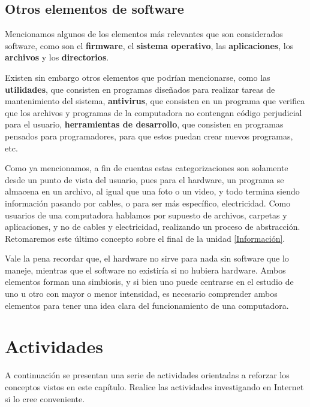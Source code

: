 \subsection{Otros elementos de software}

Mencionamos algunos de los elementos más relevantes que son considerados
software, como son el \textbf{firmware}, el \textbf{sistema operativo},
las \textbf{aplicaciones}, los \textbf{archivos} y los \textbf{directorios}.

Existen sin embargo otros elementos que podrían mencionarse, como las
\textbf{utilidades}, que consisten en programas diseñados para realizar tareas
de mantenimiento del sistema, \textbf{antivirus}, que consisten en un programa
que verifica que los archivos y programas de la computadora no contengan
código perjudicial para el usuario, \textbf{herramientas de desarrollo}, que
consisten en programas pensados para programadores, para que estos puedan
crear nuevos programas, etc.

Como ya mencionamos, a fin de cuentas estas categorizaciones son solamente
desde un punto de vista del usuario, pues para el hardware, un programa se
almacena en un archivo, al igual que una foto o un video, y todo termina
siendo información pasando por cables, o para ser más específico, electricidad.
Como usuarios de una computadora hablamos por supuesto de archivos, carpetas y
aplicaciones, y no de cables y electricidad, realizando un proceso de abstracción.
Retomaremos este último concepto sobre el final de la unidad \ref{Información}.

Vale la pena recordar que, el hardware no sirve para nada sin software que lo
maneje, mientras que el software no existiría si no hubiera hardware. Ambos
elementos forman una simbiosis, y si bien uno puede centrarse en el estudio
de uno u otro con mayor o menor intensidad, es necesario comprender ambos
elementos para tener una idea clara del funcionamiento de una computadora.

\section{Actividades}

A continuación se presentan una serie de actividades orientadas a reforzar
los conceptos vistos en este capítulo. Realice las actividades investigando en
Internet si lo cree conveniente.

